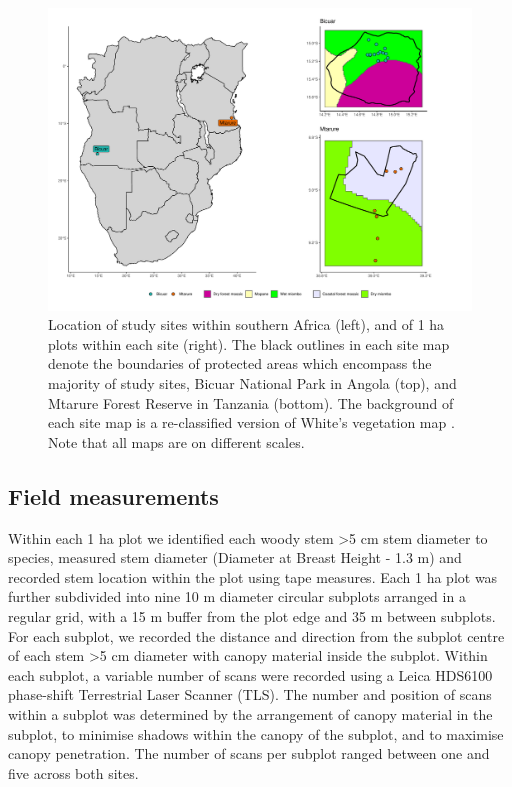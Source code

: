 \documentclass[11pt,a4paper]{article}
\begin{document}
\begin{figure}[H]
	\includegraphics[width=\textwidth]{map}
	\caption{Location of study sites within southern Africa (left), and of 1 ha plots within each site (right). The black outlines in each site map denote the boundaries of protected areas which encompass the majority of study sites, Bicuar National Park in Angola (top), and Mtarure Forest Reserve in Tanzania (bottom). The background of each site map is a re-classified version of White's vegetation map \citep{White1983}. Note that all maps are on different scales.}
	\label{map}
\end{figure}

\subsection{Field measurements}

Within each 1 ha plot we identified each woody stem >5 cm stem diameter to species, measured stem diameter (Diameter at Breast Height - 1.3 m) and recorded stem location within the plot using tape measures. Each 1 ha plot was further subdivided into nine 10 m diameter circular subplots arranged in a regular grid, with a 15 m buffer from the plot edge and 35 m between subplots. For each subplot, we recorded the distance and direction from the subplot centre of each stem >5 cm diameter with canopy material inside the subplot. Within each subplot, a variable number of scans were recorded using a Leica HDS6100 phase-shift Terrestrial Laser Scanner (TLS). The number and position of scans within a subplot was determined by the arrangement of canopy material in the subplot, to minimise shadows within the canopy of the subplot, and to maximise canopy penetration. The number of scans per subplot ranged between one and five across both sites. 
\end{document}
